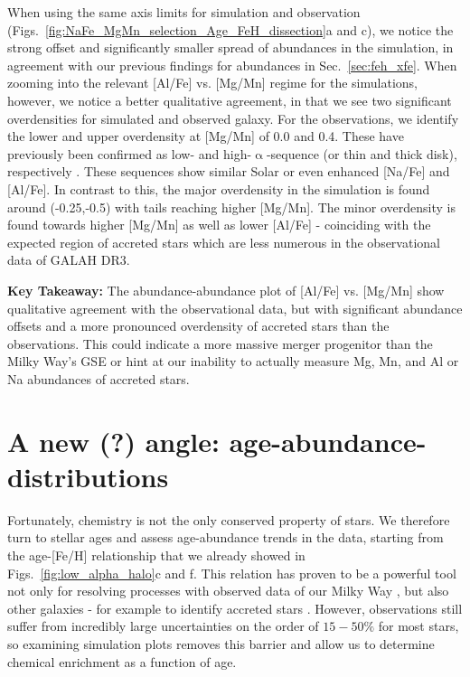 \documentclass[fleqn,usenatbib]{mnras}
\begin{document}
When using the same axis limits for simulation and observation (Figs.~\ref{fig:NaFe_MgMn_selection_Age_FeH_dissection}a and c), we notice the strong offset and significantly smaller spread of abundances in the simulation, in agreement with our previous findings for abundances in Sec.~\ref{sec:feh_xfe}. When zooming into the relevant [Al/Fe] vs. [Mg/Mn] regime for the simulations, however, we notice a better qualitative agreement, in that we see two significant overdensities for simulated and observed galaxy. For the observations, we identify the lower and upper overdensity at [Mg/Mn] of 0.0 and 0.4. These have previously been confirmed as low- and high-$\upalpha$-sequence (or thin and thick disk), respectively \citep{Hawkins2015, Buder2022}. These sequences show similar Solar or even enhanced [Na/Fe] and [Al/Fe]. In contrast to this, the major overdensity in the simulation is found around (-0.25,-0.5) with tails reaching higher [Mg/Mn]. The minor overdensity is found towards higher [Mg/Mn] as well as lower [Al/Fe] - coinciding with the expected region of accreted stars \citep{Horta2021} which are less numerous in the observational data of GALAH DR3.

\textbf{Key Takeaway:} The abundance-abundance plot of [Al/Fe] vs. [Mg/Mn] show qualitative agreement with the observational data, but with significant abundance offsets and a more pronounced overdensity of accreted stars than the observations. This could indicate a more massive merger progenitor than the Milky Way's GSE or hint at our inability to actually measure Mg, Mn, and Al or Na abundances of accreted stars.

\section{A new (?) angle: age-abundance-distributions}\label{sec:Age-abundance}

Fortunately, chemistry is not the only conserved property of stars. We therefore turn to stellar ages and assess age-abundance trends in the data, starting from the age-[Fe/H] relationship that we already showed in Figs.~\ref{fig:low_alpha_halo}c and f. This relation has proven to be a powerful tool not only for resolving processes with observed data of our Milky Way \citep[e.g.][]{Twarog1980, Edvardsson1993, Nordstroem2004, Casagrande2011, Feuillet2019, Xiang2022}, but also other galaxies - for example to identify accreted stars \citep[e.g.][]{Pinna2019b, Martig2021}. However, observations still suffer from incredibly large uncertainties on the order of $15-50\%$ for most stars, so examining simulation plots removes this barrier and allow us to determine chemical enrichment as a function of age.
\end{document}
